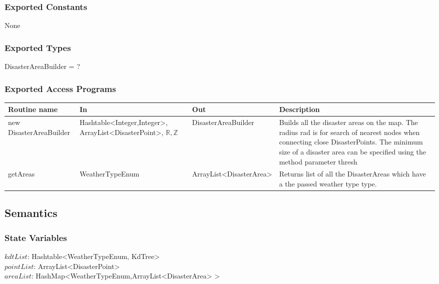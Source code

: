 \documentclass[12pt]{article}
\begin{document}
                \subsubsection * {Exported Constants}
                
                None
                
                \subsubsection* {Exported Types}
                
                DisasterAreaBuilder = ?
                
                \subsubsection* {Exported Access Programs}
                
                \begin{tabular}{| p{3cm} | p{5cm} | l | p{5cm} |}
                \hline
                \textbf{Routine name} & \textbf{In} & \textbf{Out} & \textbf{Description}\\
                \hline
                new DisasterAreaBuilder&Hashtable<Integer,Integer>, ArrayList<DisasterPoint>, $\mathbb{R}, \mathbb{Z}$&  DisasterAreaBuilder      &Builds all the disaster areas on the map. The radius rad is for search of nearest nodes when connecting close DisasterPoints. The minimum size of a disaster area can be specified using the method parameter thresh\\
                \hline
                getAreas&WeatherTypeEnum&ArrayList<DisasterArea>&Returns list of all the DisasterAreas which have a the passed weather type type.\\
                \hline
                \end{tabular}
                \subsection* {Semantics}
                    \subsubsection *{State Variables} 
                      $ kdtList$: Hashtable<WeatherTypeEnum, KdTree>\\
                      $pointList$: ArrayList<DisasterPoint> \\
                      $areaList$: HashMap<WeatherTypeEnum,ArrayList<DisasterArea> >\\
                       
\end{document}
